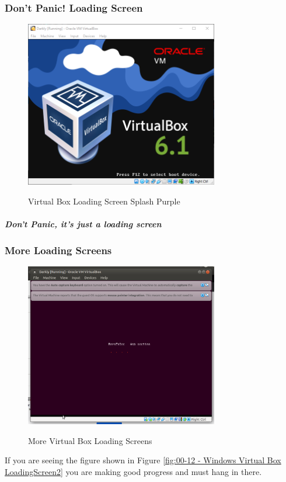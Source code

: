 \subsubsection{Don't Panic! Loading Screen}

\begin{figure}[!htb]
    \centering
    \includegraphics[width=0.752\textwidth]{images/Win00-11.png}\\[0cm]  
    \caption[Windows Virtual Box]{Virtual Box Loading Screen Splash Purple}
    \label{fig:00-11 - Windows Virtual Box LoadingScreen1} 
\end{figure}
\subparagraph{Don't Panic, it's just a loading screen}

\subsubsection{More Loading Screens}
\begin{figure}[!htb]
    \centering
    \includegraphics[width=0.752\textwidth]{images/00-12.png}\\[0cm]  
    \caption[Windows Virtual Box]{More Virtual Box Loading Screens}
    \label{fig:00-12 - Windows Virtual Box LoadingScreen2} 
\end{figure}
If you are seeing the figure shown in Figure \vref{fig:00-12 - Windows Virtual Box LoadingScreen2}
you are making good progress and must hang in there.


